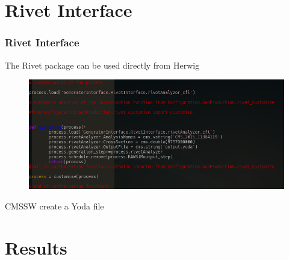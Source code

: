 \documentclass{beamer}
\numberwithin{figure}{section}
\begin{document}

\section{Rivet Interface}
\begin{frame}
\frametitle{Rivet Interface}
 The Rivet package can be used directly from Herwig
 
 \begin{figure}
  \centering
  \includegraphics[width=\textwidth]{pictures/Rivet}
 \end{figure}
 
 \begin{exampleblock}{CMSSW create a Yoda file}
     \small{}  
 \end{exampleblock}

\end{frame}




\section{Results}
\end{document}
